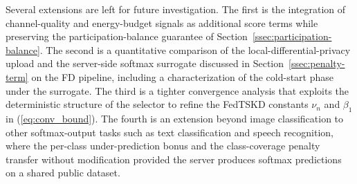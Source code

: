 \documentclass[journal]{IEEEtran}
\newcommand{\new}[1]{#1}
\begin{document}
\new{

Several extensions are left for future investigation. The first is the integration of channel-quality and energy-budget signals as additional score terms while preserving the participation-balance guarantee of Section~\ref{ssec:participation-balance}. The second is a quantitative comparison of the local-differential-privacy upload and the server-side softmax surrogate discussed in Section~\ref{ssec:penalty-term} on the FD pipeline, including a characterization of the cold-start phase under the surrogate. The third is a tighter convergence analysis that exploits the deterministic structure of the selector to refine the FedTSKD constants $\nu_n$ and $\beta_1$ in (\ref{eq:conv_bound}). The fourth is an extension beyond image classification to other softmax-output tasks such as text classification and speech recognition, where the per-class under-prediction bonus and the class-coverage penalty transfer without modification provided the server produces softmax predictions on a shared public dataset.}
\balance

{\setlength{\itemsep}{0pt plus 0.2ex}\setlength{\parsep}{0pt}
}
\end{document}
